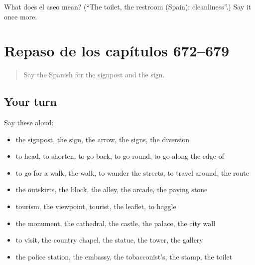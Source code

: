 \begin{tcolorbox}[breakable,colback=teal!4,colframe=teal!35!black,title={Before you move on}]
What does el aseo mean? (\textquotedblleft{}The toilet, the restroom (Spain); cleanliness\textquotedblright{}.) Say it once more.
\end{tcolorbox}
\section[(dialogue)]{Repaso de los capítulos 672–679}

\label{lesson:ES-R679-repaso-672-679}



\begin{quote}
Say the Spanish for the signpost and the sign.
\end{quote}

\subsection*{Your turn}
Say these aloud:

\begin{itemize}
\raggedright
  \item the signpost, the sign, the arrow, the signs, the diversion
  \item to head, to shorten, to go back, to go round, to go along the edge of
  \item to go for a walk, the walk, to wander the streets, to travel around, the route
  \item the outskirts, the block, the alley, the arcade, the paving stone
  \item tourism, the viewpoint, tourist, the leaflet, to haggle
  \item the monument, the cathedral, the castle, the palace, the city wall
  \item to visit, the country chapel, the statue, the tower, the gallery
  \item the police station, the embassy, the tobacconist’s, the stamp, the toilet
\end{itemize}

